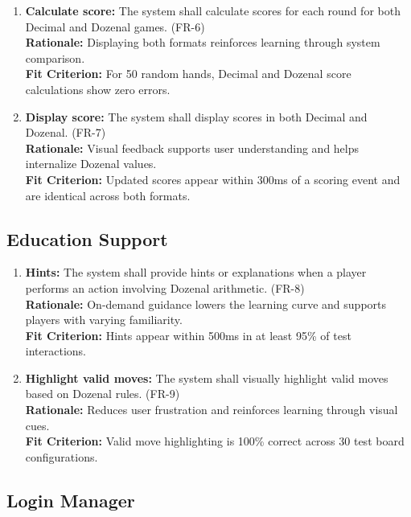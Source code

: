 \documentclass[12pt]{article}
\begin{document}
\begin{enumerate}
    \item \textbf{Calculate score:} The system shall calculate scores for each round for both Decimal and Dozenal games. (FR-6) \\
    \textbf{Rationale:} Displaying both formats reinforces learning through system comparison. \\
    \textbf{Fit Criterion:} For 50 random hands, Decimal and Dozenal score calculations show zero errors.

    \item \textbf{Display score:} The system shall display scores in both Decimal and Dozenal. (FR-7) \\
    \textbf{Rationale:} Visual feedback supports user understanding and helps internalize Dozenal values. \\
    \textbf{Fit Criterion:} Updated scores appear within 300ms of a scoring event and are identical across both formats.
\end{enumerate}

\subsection{Education Support}

\begin{enumerate}
    \item \textbf{Hints:} The system shall provide hints or explanations when a player performs an action involving Dozenal arithmetic. (FR-8) \\
    \textbf{Rationale:} On-demand guidance lowers the learning curve and supports players with varying familiarity. \\
    \textbf{Fit Criterion:} Hints appear within 500ms in at least 95\% of test interactions.

    \item \textbf{Highlight valid moves:} The system shall visually highlight valid moves based on Dozenal rules. (FR-9) \\
    \textbf{Rationale:} Reduces user frustration and reinforces learning through visual cues. \\
    \textbf{Fit Criterion:} Valid move highlighting is 100\% correct across 30 test board configurations.
\end{enumerate}

\subsection{Login Manager}
\end{document}

